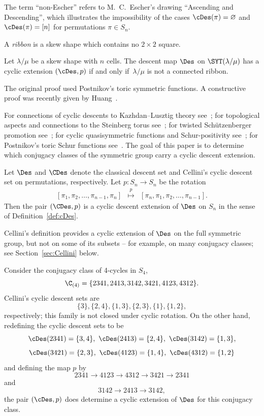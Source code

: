 The term ``non-Escher'' refers to M.\ C.\ Escher's drawing ``Ascending and Descending'', which illustrates the impossibility
of the cases $\cDes(\pi) = \varnothing$ and $\cDes(\pi) = [n]$ for permutations $\pi \in S_n$.

A {\em ribbon} is a skew shape which contains no $2 \times 2$ square.
	
\begin{theorem}\label{conj1}
    Let $\lambda/\mu$ be a skew shape with $n$ cells.
    The descent map $\Des$ on $\SYT(\lambda/\mu)$ has a cyclic extension $(\cDes,p)$ if and only if~$\lambda/\mu$ is not a connected ribbon.
\end{theorem}
	
The original proof used Postnikov's toric symmetric functions.
A constructive proof was recently given by Huang~\cite{Huang}.

For connections of cyclic descents to 
Kazhdan--Lusztig theory see~\cite{Rhoades}; for topological aspects and connections to the  
Steinberg torus see~\cite{DPS}; for twisted Sch\"utzenberger promotion see~\cite{Rhoades, Huang}; for cyclic quasisymmetric functions and Schur-positivity see~\cite{AGRR};	for Postnikov's toric Schur functions see~\cite{ARR}.
The goal of this paper is to determine which conjugacy classes of the symmetric group carry a cyclic descent extension.
		
\begin{observation}
    Let $\Des$ and $\CDes$ denote the classical descent set and Cellini's cyclic descent set on permutations, respectively.
    Let $p: S_n \rightarrow S_n$ be the rotation 
    \[
        \begin{array}{rcl}
            [\pi_1,\pi_2,\ldots,\pi_{n-1},\pi_n]&\overset{p}{\longmapsto}&
            [\pi_n,\pi_1,\pi_2,\ldots,\pi_{n-1}]. 
        \end{array}
    \]
    Then the pair $(\CDes,p)$ is a cyclic descent extension of $\Des$ on $S_n$ in the sense of Definition~\ref{def:cDes}.
\end{observation}
	
Cellini's definition provides a cyclic extension of $\Des$ on the full symmetric group, but not on some of its subsets -- for example, on many conjugacy classes;
see Section~\ref{sec:Cellini} below.

\begin{example}
    Consider the conjugacy class of 4-cycles in $S_4$,
    \[
        \C_{(4)}=\{2341, 2413, 3142, 3421, 4123, 4312\}.
    \]
    Cellini's cyclic descent sets are
    \[
        \{3\}, \{2,4\}, \{1,3\}, \{2,3\}, \{1\}, \{1,2\},
    \]
    respectively; this family is not closed under cyclic rotation.
    On the other hand, redefining the cyclic descent sets to be
    \[
        \cDes(2341)=\{3,4\},\ \cDes(2413)=\{2,4\}, \ \cDes(3142)=\{1,3\}, 
    \]
    \[
        \cDes(3421)=\{2,3\},\ \cDes(4123)=\{1,4\},\ \cDes(4312)=\{1,2\}
    \]
    and defining the map $p$ by
    \[
        2341 \rightarrow 4123 \rightarrow 4312 \rightarrow 3421 \rightarrow 2341
    \]
    and
    \[
        3142 \rightarrow 2413 \rightarrow 3142,
    \]
    the pair $(\cDes,p)$ does determine a cyclic extension of $\Des$ for this conjugacy class.
\end{example}
	
